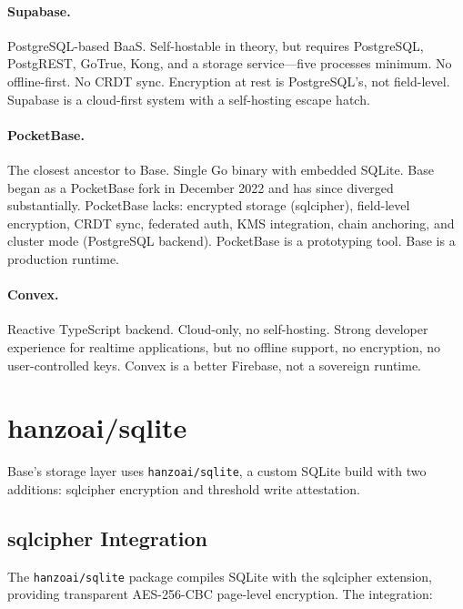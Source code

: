 \documentclass[11pt]{article}
\begin{document}
\paragraph{Supabase.} PostgreSQL-based BaaS. Self-hostable in theory, but
requires PostgreSQL, PostgREST, GoTrue, Kong, and a storage service---five
processes minimum. No offline-first. No CRDT sync. Encryption at rest is
PostgreSQL's, not field-level. Supabase is a cloud-first system with a
self-hosting escape hatch.

\paragraph{PocketBase.} The closest ancestor to Base. Single Go binary with
embedded SQLite. Base began as a PocketBase fork in December 2022 and has since
diverged substantially. PocketBase lacks: encrypted storage (sqlcipher),
field-level encryption, CRDT sync, federated auth, KMS integration, chain
anchoring, and cluster mode (PostgreSQL backend). PocketBase is a prototyping
tool. Base is a production runtime.

\paragraph{Convex.} Reactive TypeScript backend. Cloud-only, no self-hosting.
Strong developer experience for realtime applications, but no offline support,
no encryption, no user-controlled keys. Convex is a better Firebase, not a
sovereign runtime.

\section{hanzoai/sqlite}
\label{sec:sqlite}

Base's storage layer uses \texttt{hanzoai/sqlite}, a custom SQLite build with
two additions: sqlcipher encryption and threshold write attestation.

\subsection{sqlcipher Integration}

The \texttt{hanzoai/sqlite} package compiles SQLite with the sqlcipher extension,
providing transparent AES-256-CBC page-level encryption. The integration:
\end{document}
